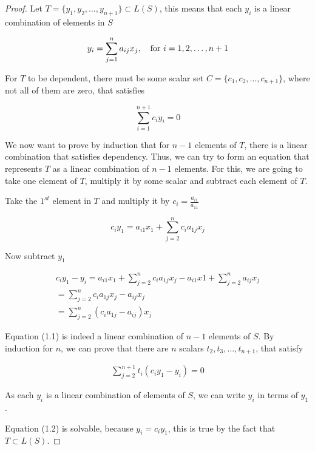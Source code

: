 \documentclass{book}
\begin{document}
\begin{proof}
    Let $T=\{y_1,y_2,\dots,y_{n+1}\}\subset L(S)$, this means that each $y_i$ is
    a linear combination of elements in $S$

    \[
        y_i=\sum_{j=1}^{n}{a_{ij}x_j}, \quad \textnormal{for } i=1,2,\dots,n+1
    \]

    For $T$ to be dependent, there must be some scalar set
    $C=\{c_1,c_2,\dots,c_{n+1}\}$, where not all of them are zero, that satisfies

    \[
        \sum_{i=1}^{n+1}{c_i y_i}=0
    \]

    We now want to prove by induction that for $n-1$ elements of $T$, there is a
    linear combination that satisfies dependency. Thus, we can try to form an
    equation that represents $T$ as a linear combination of $n-1$ elements. For
    this, we are going to take one element of $T$, multiply it by some scalar and
    subtract each element of $T$.

    Take the $1^{st}$ element in $T$ and multiply it by $c_i=\frac{a_{i1}}{a_{11}}$

    \[
        c_i y_1 = a_{i1}x_1 + \sum_{j=2}^{n}{c_i a_{1j} x_j}
    \]

    Now subtract $y_1$

    \begin{equation}
        \begin{split}
            c_i y_1 - y_i= a_{i1}x_1 + \sum_{j=2}^{n}{c_i a_{1j} x_j} - a_{i1}x1 +
            \sum_{j=2}^{n}{a_{ij}x_j}
            \\ = \sum_{j=2}^{n}{c_i a_{1j} x_j - a_{ij}x_j}
            \\ = \sum_{j=2}^{n}{\left(c_i a_{1j}- a_{ij}\right)x_j}
        \end{split}
    \end{equation}

    Equation (1.1) is indeed a linear combination of $n-1$ elements of $S$. By
    induction for $n$, we can prove that there are $n$ scalars
    $t_2,t_3,\dots,t_{n+1}$, that satisfy

    \begin{equation}
        \begin{split}
            \sum_{j=2}^{n+1}{t_i\left(c_i y_1- y_i\right)} = 0
        \end{split}
    \end{equation}

    As each $y_i$ is a linear combination of elements of $S$, we can write $y_i$ in
    terms of $y_1$.

    Equation (1.2) is solvable, because $y_i=c_i y_1$, this is true by the fact
    that $T\subset L(S)$.
\end{proof}
\end{document}

